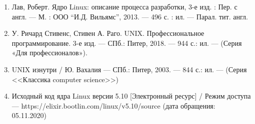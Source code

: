 


\begin{enumerate}
	\item Лав, Роберт. Ядро Linux: описание процесса разработки, 3-е изд. : Пер. с англ. — М. : ООО “И.Д. Вильямс”, 2013. — 496 с. : ил. — Парал. тит. англ.
	\item У. Ричард Стивенс, Стивен А. Раго. UNIX. Профессиональное программирование. 3-е изд. — СПб.: Питер, 2018. —
944 с.: ил. — (Серия «Для профессионалов»).
	\item UNIX изнутри / Ю. Вахалия --- СПб.: Питер, 2003. --- 844 с.: ил. --- (Серия <<Классика computer science>>)
	\item Исходный код ядра Linux версии 5.10 [Электронный ресурс] / Режим доступа --- https://elixir.bootlin.com/linux/v5.10/source (дата обращения: 05.11.2020)
\end{enumerate}
